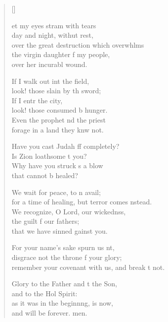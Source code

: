 \settowidth{\versewidth}{remember your covenant with us, and break it not.}
\begin{verse}[\versewidth]
  \begin{patverse}
et my eyes stram with tears\Med\\
day and night, withut rest,\\
over the great destruction which overwhlms\Flex\\
the virgin daughter f my people,\Med\\
over her incurabl wound.

If I walk out int the field,\Med\\
look! those slain by th sword;\\
If I entr the city,\Med\\
look! those consumed b hunger.\\
Even the prophet nd the priest\Med\\
forage in a land they knw not.

Have you cast Judah ff completely?\Med\\
Is Zion loathsome t you?\\
Why have you struck s a blow\Med\\
that cannot b healed?

We wait for peace, to n avail;\Med\\
for a time of healing, but terror comes \pointup{\i}nstead.\\
We recognize, O Lord, our wickednss,\Flex\\
the guilt f our fathers;\Med\\
that we have sinned gainst you.

For your name’s sake spurn us nt,\Flex\\
disgrace not the throne f your glory;\Med\\
remember your covenant with us, and break \pointup{\i}t not.

Glory to the Father and t the Son,\Med\\
and to the Hol Spirit:\\
as it was in the beginnng, is now,\Med\\
and will be forever. men.
  \end{patverse}
\end{verse}
